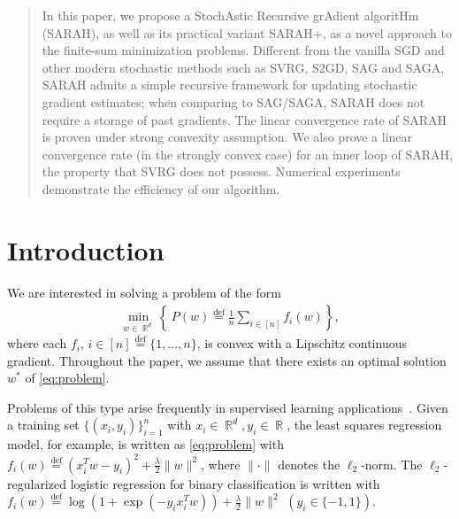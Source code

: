 \documentclass{article}
\DeclareMathOperator{\R}{\mathbb{R}}
\newcommand{\eqdef}{\stackrel{\text{def}}{=}}
\newcommand{\setn}{[n]}
\begin{document}

\printAffiliationsAndNotice{}  %

\begin{abstract} 
In this paper, we propose a StochAstic Recursive grAdient algoritHm (SARAH), as well as its practical variant SARAH+, as a novel approach to the finite-sum minimization problems. Different from the vanilla SGD and other modern stochastic methods such as SVRG, S2GD, SAG and SAGA, SARAH admits a simple recursive framework for updating stochastic gradient estimates; when comparing to SAG/SAGA, SARAH does not require a storage of past gradients. The linear convergence rate of SARAH is proven under strong convexity assumption. We also prove a linear convergence rate (in the strongly convex case) for an inner loop of SARAH, the property that SVRG does not possess. Numerical experiments demonstrate the efficiency of our algorithm.
\end{abstract} 


\section{Introduction}
\label{introduction}
We are interested in solving a problem of the form
\begin{gather}\label{eq:problem}
\min_{w\in\R^d} \left\{ \ P(w) \eqdef \frac{1}{n} \sum_{i\in\setn} f_i(w)\right\},
\end{gather}
where each $f_i$, $i \in \setn\eqdef\{1,\dots,n\}$, is convex 
with a Lipschitz continuous gradient. Throughout the paper, we assume that there exists an optimal solution $w^{*}$ of \eqref{eq:problem}. 

Problems of this type arise frequently in supervised learning applications~\cite{ESL}. Given a training set $\{(x_i,y_i)\}_{i=1}^n$ with $x_i \in\R^{d}, y_i\in\R$, the  least squares regression model, for example, is written as \eqref{eq:problem} with $f_i(w)\eqdef (x_i^Tw-y_i)^2 + \frac{\lambda}{2} \|w\|^2$, where $\|\cdot\|$ denotes the $\ell_2$-norm. The $\ell_2$-regularized logistic regression  for binary classification is written with $f_i(w) \eqdef \log (1+\exp(-y_ix_i^Tw)) + \frac{\lambda}{2}\|w\|^2$ $(y_i\in\{-1,1\})$.
\end{document}

